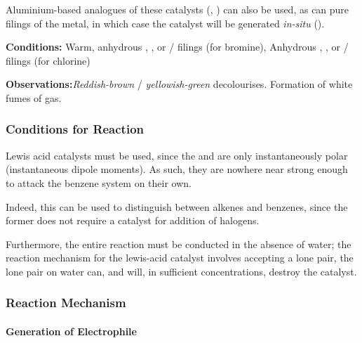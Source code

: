 				Aluminium-based analogues of these catalysts (, ) can also be used, as can pure
				filings of the metal, in which case the catalyst will be generated \textit{in-situ} ().


				\vspace{1.5em}
				\vbox{\textbf{Conditions:}	\tabto{35mm}Warm, anhydrous , , or  / \ch{\aluminium} filings (for bromine),
											\tabto{35mm}Anhydrous , , or
														 / \ch{\aluminium} filings (for chlorine)}\vspace{0.5em}

				\vbox{\textbf{Observations:}\tabto{35mm}\textit{\color{Mahogany}Reddish-brown}  / \textit{\color{YellowGreen}yellowish-green}  decolourises.
											\tabto{35mm}Formation of white fumes of  gas.}


				\subsubsection{Conditions for Reaction}

					Lewis acid catalysts must be used, since the  and \ch{\chlorine-\chlorine} are only instantaneously polar (instantaneous
					dipole moments). As such, they are nowhere near strong enough to attack the benzene system on their own.

					Indeed, this can be used to distinguish between alkenes and benzenes, since the former does not require a catalyst for addition
					of halogens.

					Furthermore, the entire reaction must be conducted in the absence of water; the reaction mechanism for the lewis-acid catalyst
					involves accepting a lone pair, the lone pair on water can, and will, in sufficient concentrations, destroy the catalyst.




				\subsubsection{Reaction Mechanism}

					\paragraph{Generation of Electrophile}

